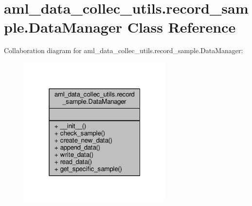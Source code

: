 \hypertarget{classaml__data__collec__utils_1_1record__sample_1_1_data_manager}{\section{aml\-\_\-data\-\_\-collec\-\_\-utils.\-record\-\_\-sample.\-Data\-Manager Class Reference}
\label{classaml__data__collec__utils_1_1record__sample_1_1_data_manager}
}


Collaboration diagram for aml\-\_\-data\-\_\-collec\-\_\-utils.\-record\-\_\-sample.\-Data\-Manager\-:
\nopagebreak
\begin{figure}[H]
\begin{center}
\leavevmode
\includegraphics[width=220pt]{classaml__data__collec__utils_1_1record__sample_1_1_data_manager__coll__graph}
\end{center}
\end{figure}
